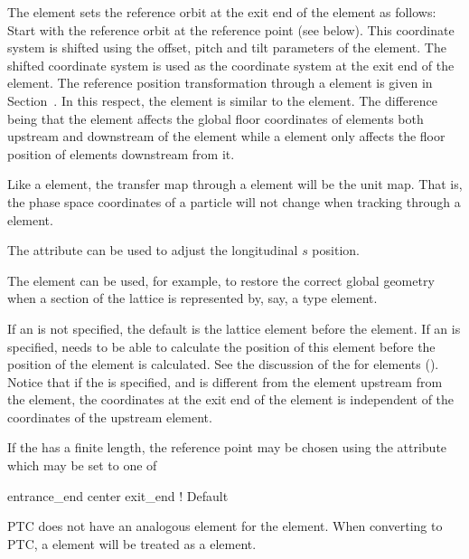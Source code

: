 The  element sets the reference orbit at the exit end of the 
element as follows: Start with the reference orbit at the  reference point (see
below). This coordinate system is shifted using the offset, pitch and tilt parameters of the
 element. The shifted coordinate system is used as the coordinate system at the exit
end of the  element. The reference position transformation through a
 element is given in Section~. In this respect, the 
element is similar to the  element. The difference being that the  element affects
the global floor coordinates of elements both upstream and downstream of the  element while a
 element only affects the floor position of elements downstream from it.
 
Like a  element, the transfer map through a  element will be the
unit map. That is, the phase space coordinates of a particle will not change when tracking through a
 element. 

The  attribute can be used to adjust the longitudinal $s$ position.

The  element can be used, for example, to restore the
correct global geometry when a section of the lattice is represented by, say,
a  type element.

If an  is not specified, the default  is the lattice element before
the  element.  If an  is specified, \bmad needs to be able to
calculate the position of this element before the position of the  element is
calculated. See the discussion of the  for  elements
().  Notice that if the  is specified, and is different from the
element upstream from the  element, the coordinates at the exit end of the
 element is independent of the coordinates of the upstream element.

If the  has a finite length, the reference point may be chosen using the
 attribute which may be set to one of
\begin{example}
  entrance_end
  center
  exit_end         ! Default
\end{example}


PTC does not have an analogous element for the  element. When converting to PTC, a
 element will be treated as a  element.

